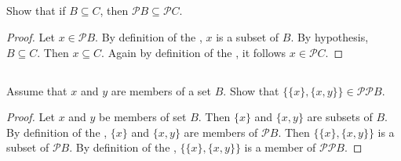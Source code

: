 \documentclass{report}
\begin{document}
\subsection{}%
\label{sub:baby-set-theory-3}

Show that if $B \subseteq C$, then $\mathscr{P} B \subseteq \mathscr{P} C$.

\begin{proof}

  Let $x \in \mathscr{P} B$.
  By definition of the , $x$ is a subset of $B$.
  By hypothesis, $B \subseteq C$.
  Then $x \subseteq C$.
  Again by definition of the , it follows
    $x \in \mathscr{P} C$.

\end{proof}

\subsection{}%
\label{sub:baby-set-theory-4}

Assume that $x$ and $y$ are members of a set $B$.
Show that $\{\{x\}, \{x, y\}\} \in \mathscr{P}\mathscr{P} B.$

\begin{proof}

  Let $x$ and $y$ be members of set $B$.
  Then $\{x\}$ and $\{x, y\}$ are subsets of $B$.
  By definition of the , $\{x\}$ and $\{x, y\}$ are
    members of $\mathscr{P} B$.
  Then $\{\{x\}, \{x, y\}\}$ is a subset of $\mathscr{P} B$.
  By definition of the , $\{\{x\}, \{x, y\}\}$ is a member
    of $\mathscr{P}\mathscr{P} B$.

\end{proof}
\end{document}
